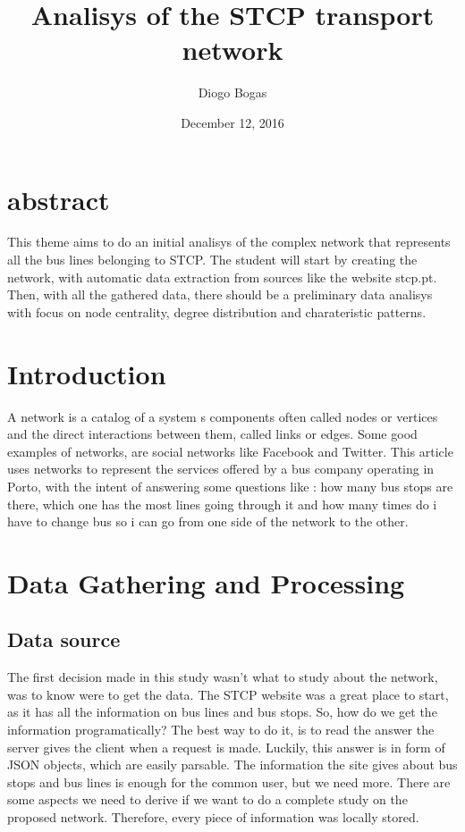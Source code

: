 \documentclass[12pt]{report}
\title{Analisys of the STCP transport network}
\author{Diogo Bogas}
\affil{DCC/FCUP}
\date{December 12, 2016}
\begin{document}
\maketitle
\newpage
{}

\section{abstract}
This theme aims to do an initial analisys of the complex network that represents all the bus lines belonging to STCP. The student will start by creating the network, with automatic data extraction from sources like the website stcp.pt.
Then, with all the gathered data, there should be a preliminary data analisys with focus on node centrality, degree distribution and charateristic patterns.


\section{Introduction}

A network is a catalog of a system\textsc{} s components often called nodes or vertices and the direct interactions  between them, called links or edges.
Some good examples of networks, are social networks like Facebook and Twitter.
This article uses networks to represent the services offered by a bus company operating in Porto, with the intent of answering some questions like : how many bus stops are there, which one has the most lines going through it and how many times do i have to change bus so i can go from one side of the network to the other. 
 

\section{Data Gathering and Processing}
\subsection{Data source}
The first decision made in this study wasn't what to study about the network, was to know were to get the data. 
The STCP website was a great place to start, as it has all the information on bus lines and bus stops. So, how do we get the information programatically?
The best way to do it, is to read the answer the server gives the client when a request is made. Luckily, this answer is in form of JSON objects, which are easily parsable.
The information the site gives about bus stops and bus lines is enough for the common user, but we need more. There are some aspects we need to derive if we want to do a complete study on the proposed network. Therefore, every piece of information was locally stored.
\end{document}
